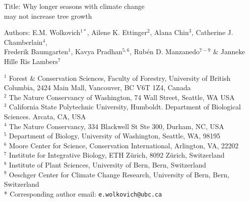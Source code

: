 \documentclass[11pt]{article}
\begin{document}
\renewcommand{\refname}{\CHead{}}

\begin{center}
{\sc Title:} {\Large Why longer seasons with climate change \\ may not increase tree growth} \\ 
\vspace{5ex}

{\sc Authors:} E.M. Wolkovich$^{1*}$, Ailene K. Ettinger$^2$, Alana Chin$^3$, Catherine J. Chamberlain$^4$,\\ Frederik Baumgarten$^1$, Kavya Pradhan$^{5,6}$, Rub{\'e}n D. Manzanedo$^{7-9}$ \&  Janneke Hille Ris Lambers$^7$
\end{center}

$^1$ Forest \& Conservation Sciences, Faculty of Forestry, University of British Columbia, 2424 Main Mall, Vancouver, BC V6T 1Z4, Canada\\
$^2$ The Nature Conservancy of Washington, 74 Wall Street, Seattle, WA  USA \\
$^3$ California State Polytechnic University, Humboldt. Department of Biological Sciences. Arcata, CA, USA \\
$^4$ The Nature Conservancy, 334 Blackwell St Ste 300, Durham, NC, USA \\ 
$^5$ Department of Biology, University of Washington, Seattle, WA, 98195 \\
$^6$ Moore Center for Science, Conservation International, Arlington, VA, 22202 \\ 
$^7$ Institute for Integrative Biology, ETH Z{\"u}rich, 8092 Z{\"u}rich, Switzerland \\
$^8$ Institute of Plant Sciences, University of Bern, Bern, Switzerland \\
$^9$ Oeschger Center for Climate Change Research, University of Bern, Bern, Switzerland \\


\newpage
* Corresponding author email: \verb|e.wolkovich@ubc.ca| 
\begin{abstract} 

Most climate change forecasts assume that longer growing seasons increase carbon storage through increased tree growth, but recent findings have challenged this assumption. Here we highlight divergent findings across studies, spanning diverse methods and disciplinary perspectives. Current hypotheses for why longer growing seasons may not always increase tree growth include drought-related effects and internal constraints. These hypotheses, however, are generally tested in different ways by different fields on different species, and rarely consider how external drivers and internal constraints interact. We outline how bridging these divides while integrating evolutionary history and ecological theory could help build a unified model across species for when longer seasons will---or will not---lead to greater tree growth, with major forecasting implications.

\end{abstract}
\end{document}
